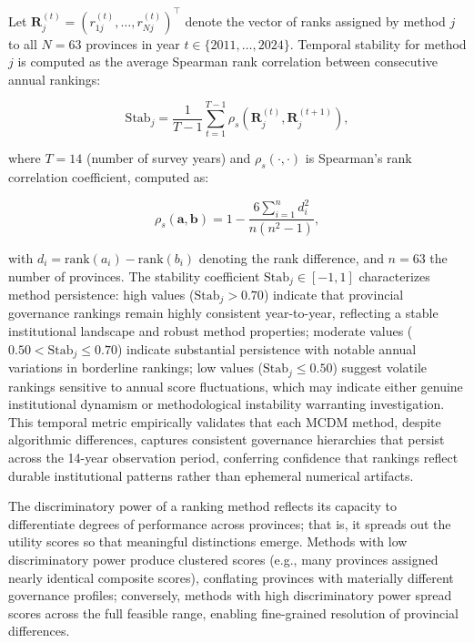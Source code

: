 \documentclass[12pt,a4paper]{article}
\begin{document}
Let $\mathbf{R}_j^{(t)} = (r_{1j}^{(t)}, \ldots, r_{Nj}^{(t)})^\top$ denote the vector of ranks assigned by method $j$ to all $N = 63$ provinces in year $t \in \{2011, \ldots, 2024\}$. Temporal stability for method $j$ is computed as the average Spearman rank correlation between consecutive annual rankings:

\begin{equation}
\label{eq:method_stability}
\mathrm{Stab}_j = \frac{1}{T-1} \sum_{t=1}^{T-1} \rho_s\left( \mathbf{R}_j^{(t)}, \mathbf{R}_j^{(t+1)} \right),
\end{equation}

where $T = 14$ (number of survey years) and $\rho_s(\cdot, \cdot)$ is Spearman's rank correlation coefficient, computed as:

\begin{equation}
\label{eq:spearman_formula}
\rho_s(\mathbf{a}, \mathbf{b}) = 1 - \frac{6 \sum_{i=1}^{n} d_i^2}{n(n^2 - 1)},
\end{equation}

with $d_i = \text{rank}(a_i) - \text{rank}(b_i)$ denoting the rank difference, and $n = 63$ the number of provinces. The stability coefficient $\mathrm{Stab}_j \in [-1, 1]$ characterizes method persistence: high values ($\mathrm{Stab}_j > 0.70$) indicate that provincial governance rankings remain highly consistent year-to-year, reflecting a stable institutional landscape and robust method properties; moderate values ($0.50 < \mathrm{Stab}_j \leq 0.70$) indicate substantial persistence with notable annual variations in borderline rankings; low values ($\mathrm{Stab}_j \leq 0.50$) suggest volatile rankings sensitive to annual score fluctuations, which may indicate either genuine institutional dynamism or methodological instability warranting investigation. This temporal metric empirically validates that each MCDM method, despite algorithmic differences, captures consistent governance hierarchies that persist across the 14-year observation period, conferring confidence that rankings reflect durable institutional patterns rather than ephemeral numerical artifacts.

The discriminatory power of a ranking method reflects its capacity to differentiate degrees of performance across provinces; that is, it spreads out the utility scores so that meaningful distinctions emerge. Methods with low discriminatory power produce clustered scores (e.g., many provinces assigned nearly identical composite scores), conflating provinces with materially different governance profiles; conversely, methods with high discriminatory power spread scores across the full feasible range, enabling fine-grained resolution of provincial differences.
\end{document}
